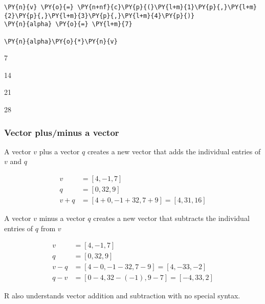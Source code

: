     \begin{tcolorbox}[breakable, size=fbox, boxrule=1pt, pad at break*=1mm,colback=cellbackground, colframe=cellborder]
\begin{Verbatim}[commandchars=\\\{\}]
\PY{n}{v} \PY{o}{=} \PY{n+nf}{c}\PY{p}{(}\PY{l+m}{1}\PY{p}{,}\PY{l+m}{2}\PY{p}{,}\PY{l+m}{3}\PY{p}{,}\PY{l+m}{4}\PY{p}{)}
\PY{n}{alpha} \PY{o}{=} \PY{l+m}{7}

\PY{n}{alpha}\PY{o}{*}\PY{n}{v}
\end{Verbatim}
\end{tcolorbox}

    \begin{enumerate*}
\item 7
\item 14
\item 21
\item 28
\end{enumerate*}


    
    \hypertarget{vector-plusminus-a-vector}{%
\subsubsection{Vector plus/minus a
vector}\label{vector-plusminus-a-vector}}

A vector \(v\) plus a vector \(q\) creates a new vector that adds the
individual entries of \(v\) and \(q\)

\begin{align}
    v &= [4,-1,7] \\ 
    q &= [0,32,9] \\ 
    v + q &= [ 4+0, -1+32, 7+9] = [4,31,16]
\end{align}

A vector \(v\) minus a vector \(q\) creates a new vector that subtracts
the individual entries of \(q\) from \(v\)

\begin{align}
    v &= [4,-1,7] \\ 
    q &= [0,32,9] \\ 
    v - q &= [ 4-0, -1-32, 7-9] = [4,-33,-2]\\
    q - v &= [ 0-4, 32-(-1), 9-7] = [-4,33,2]
\end{align}

R also understands vector addition and subtraction with no special
syntax.

